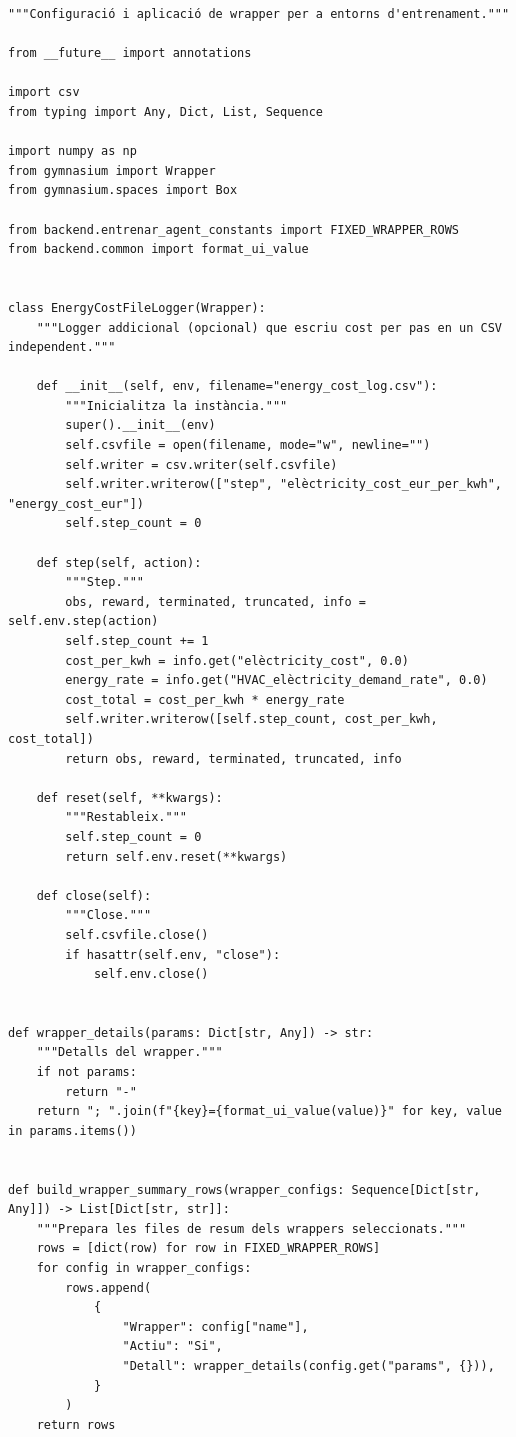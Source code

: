 \documentclass[10pt,a4paper]{article}
\begin{document}
\begin{lstlisting}[style=studioPython,caption={backend/entrenar\_agent\_wrappers.py},label={lst:backend-entrenar-agent-wrappers-py}]
"""Configuració i aplicació de wrapper per a entorns d'entrenament."""

from __future__ import annotations

import csv
from typing import Any, Dict, List, Sequence

import numpy as np
from gymnasium import Wrapper
from gymnasium.spaces import Box

from backend.entrenar_agent_constants import FIXED_WRAPPER_ROWS
from backend.common import format_ui_value


class EnergyCostFileLogger(Wrapper):
    """Logger addicional (opcional) que escriu cost per pas en un CSV independent."""

    def __init__(self, env, filename="energy_cost_log.csv"):
        """Inicialitza la instància."""
        super().__init__(env)
        self.csvfile = open(filename, mode="w", newline="")
        self.writer = csv.writer(self.csvfile)
        self.writer.writerow(["step", "elèctricity_cost_eur_per_kwh", "energy_cost_eur"])
        self.step_count = 0

    def step(self, action):
        """Step."""
        obs, reward, terminated, truncated, info = self.env.step(action)
        self.step_count += 1
        cost_per_kwh = info.get("elèctricity_cost", 0.0)
        energy_rate = info.get("HVAC_elèctricity_demand_rate", 0.0)
        cost_total = cost_per_kwh * energy_rate
        self.writer.writerow([self.step_count, cost_per_kwh, cost_total])
        return obs, reward, terminated, truncated, info

    def reset(self, **kwargs):
        """Restableix."""
        self.step_count = 0
        return self.env.reset(**kwargs)

    def close(self):
        """Close."""
        self.csvfile.close()
        if hasattr(self.env, "close"):
            self.env.close()


def wrapper_details(params: Dict[str, Any]) -> str:
    """Detalls del wrapper."""
    if not params:
        return "-"
    return "; ".join(f"{key}={format_ui_value(value)}" for key, value in params.items())


def build_wrapper_summary_rows(wrapper_configs: Sequence[Dict[str, Any]]) -> List[Dict[str, str]]:
    """Prepara les files de resum dels wrappers seleccionats."""
    rows = [dict(row) for row in FIXED_WRAPPER_ROWS]
    for config in wrapper_configs:
        rows.append(
            {
                "Wrapper": config["name"],
                "Actiu": "Si",
                "Detall": wrapper_details(config.get("params", {})),
            }
        )
    return rows



\end{lstlisting}
\end{document}
